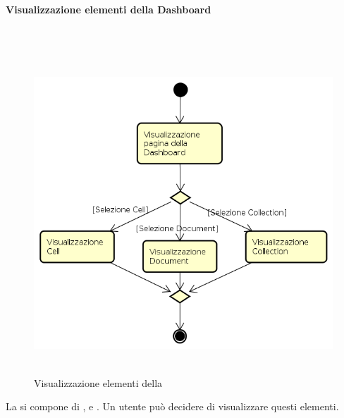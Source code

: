 \paragraph{Visualizzazione elementi della Dashboard} \mbox{} \\
\begin{figure}[H]
\begin{center}
\includegraphics[height=12cm]{res/sections/backend/activities/visualizzazioneElementDashboard.png}
\caption{Visualizzazione elementi della }
\end{center}
\end{figure}
\newpage
La  si compone di ,  e . Un utente può decidere di visualizzare questi elementi.
